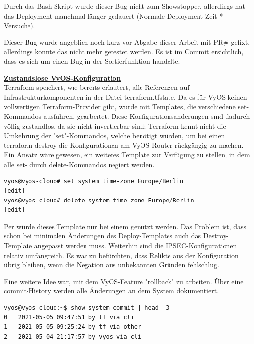 Durch das Bash-Skript wurde dieser Bug nicht zum Showstopper, allerdings hat das Deployment manchmal länger gedauert (Normale Deployment Zeit * Versuche).

Dieser Bug wurde angeblich noch kurz vor Abgabe dieser Arbeit mit PR# gefixt, allerdings konnte das nicht mehr getestet werden. Es ist im Commit ersichtlich, dass es sich um einen Bug in der Sortierfunktion handelte.

\textbf{\underline{Zustandslose VyOS-Konfiguration}}\\
Terraform speichert, wie bereits erläutert, alle Referenzen auf Infrastrukturkomponenten in der Datei terraform.tfstate. Da es für VyOS keinen vollwertigen Terraform-Provider gibt, wurde mit Templates, die verschiedene set-Kommandos ausführen, gearbeitet. Diese Konfigurationsänderungen sind dadurch völlig zustandlos, da sie nicht invertierbar sind: Terraform kennt nicht die Umkehrung der "set"-Kommandos, welche benötigt würden, um bei einen \glqq terraform destroy\grqq{} die Konfigurationen am VyOS-Router rückgängig zu machen.
Ein Ansatz wäre gewesen, ein weiteres Template zur Verfügung zu stellen, in dem alle set- durch delete-Kommandos negiert werden.\\
\begin{lstlisting}[label=set-delete-vyos,caption=delete negiert das vorherige set-Kommando.]
vyos@vyos-cloud# set system time-zone Europe/Berlin
[edit]
vyos@vyos-cloud# delete system time-zone Europe/Berlin
[edit]
\end{lstlisting}
Per  würde dieses Template nur bei einem  genutzt werden. Das Problem ist, dass schon bei minimalen Änderungen des Deploy-Templates auch das Destroy-Template angepasst werden muss. Weiterhin sind die IPSEC-Konfigurationen relativ umfangreich. Es war zu befürchten, dass Relikte aus der Konfiguration übrig bleiben, wenn die Negation aus unbekannten Gründen fehlschlug.

Eine weitere Idee war, mit dem VyOS-Feature "rollback" zu arbeiten. Über eine commit-History werden alle Änderungen an dem System dokumentiert.
\begin{lstlisting}[label=commit-history-vyos,caption=Commit History VyOS]
vyos@vyos-cloud:~$ show system commit | head -3
0   2021-05-05 09:47:51 by tf via cli
1   2021-05-05 09:25:24 by tf via other
2   2021-05-04 21:17:57 by vyos via cli
\end{lstlisting}

